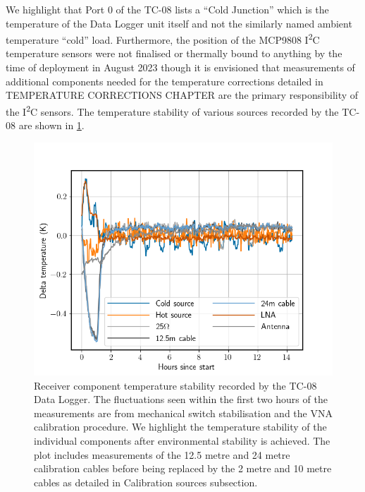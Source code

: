 We highlight that Port 0 of the TC-08 lists a “Cold Junction” which is the temperature of the Data Logger unit itself and not the similarly named ambient temperature “cold” load. Furthermore, the position of the MCP9808 I\textsuperscript{2}C temperature sensors were not finalised or thermally bound to anything by the time of deployment in August 2023 though it is envisioned that measurements of additional components needed for the temperature corrections detailed in TEMPERATURE CORRECTIONS CHAPTER are the primary responsibility of the I\textsuperscript{2}C sensors. The temperature stability of various sources recorded by the TC-08 are shown in \cref{fig:temperature}.
\begin{figure}
    \centering
    \includegraphics[scale=0.6]{temperature}
    \caption{Receiver component temperature stability recorded by the TC-08 Data Logger. The fluctuations seen within the first two hours of the measurements are from mechanical switch stabilisation and the VNA calibration procedure. We highlight the temperature stability of the individual components after environmental stability is achieved. The plot includes measurements of the 12.5 metre and 24 metre calibration cables before being replaced by the 2 metre and 10 metre cables as detailed in Calibration sources subsection.}
    \label{fig:temperature}
\end{figure}


